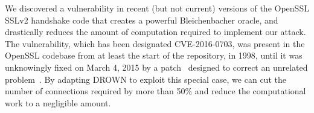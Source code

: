 \label{sec:special}

We discovered a vulnerability in recent
(but not current) versions of the OpenSSL SSLv2 handshake code that
creates a powerful Bleichenbacher oracle, and drastically reduces the amount
of computation required to implement our attack.  
The vulnerability, which has been designated CVE-2016-0703, was
present in the OpenSSL codebase from at least the start of the repository,
in 1998, until it was unknowingly fixed on March 4, 2015 by a
patch~\cite{openssl-clear-patch} designed to correct an unrelated
problem~\cite{CVE-2015-0293}.
By adapting DROWN to
exploit this special case, we can cut the number of connections
required by more than 50\% and reduce the computational work to a negligible amount.





\tabDrownAll






